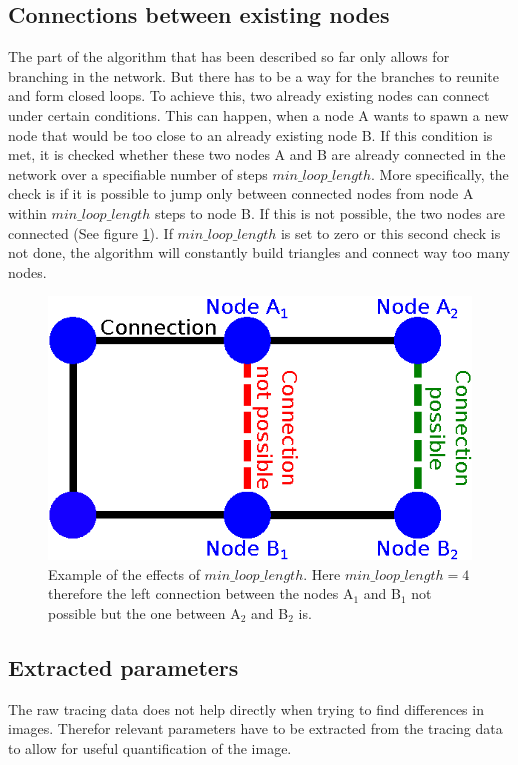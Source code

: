 \documentclass[12pt,english,twocolumn]{revtex4}
\begin{document}
\subsection{Connections between existing nodes} \label{sec:closures}
The part of the algorithm that has been described so far only allows for branching in the network. But there has to be a way for the branches to reunite and form closed loops. To achieve this, two already existing nodes can connect under certain conditions. This can happen, when a node A wants to spawn a new node that would be too close to an already existing node B. If this condition is met, it is checked whether these two nodes A and B are already connected in the network over a specifiable number of steps $min\_loop\_length$. More specifically, the check is if it is possible to jump only between connected nodes from node A within $min\_loop\_length$ steps to node B. If this is not possible, the two nodes are connected (See figure \ref{fig:min_loop_length}). If $min\_loop\_length$ is set to zero or this second check is not done, the algorithm will constantly build triangles and connect way too many nodes.
\begin{figure}[h!]
	\includegraphics[width=\linewidth]{figures/min_loop_length.eps}
	\caption{Example of the effects of $min\_loop\_length$. Here $min\_loop\_length = 4$ therefore the left connection between the nodes A$_1$ and B$_1$ not possible but the one between A$_2$ and B$_2$ is.}
	\label{fig:min_loop_length}
\end{figure}



\subsection{Extracted parameters} \label{sec:extr_params}
The raw tracing data does not help directly when trying to find differences in images. Therefor relevant parameters have to be extracted from the tracing data to allow for useful quantification of the image.\\
\end{document}
